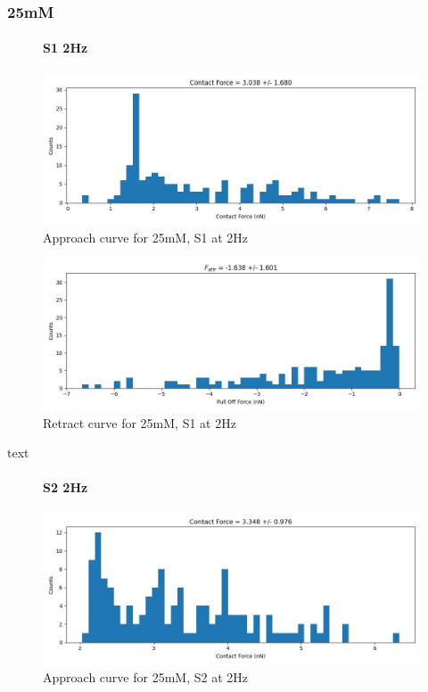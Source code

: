 \subsubsection*{25mM}

\begin{figure}[h!]
\paragraph{S1 2Hz}
\centering
\includegraphics[width=\textwidth]{chapter7/Tip speed/25mM/S1 2Hz/approach_f_c_hist.jpg}
\caption{Approach curve for 25mM, S1 at 2Hz}
\end{figure}

\begin{figure}[h!]
\centering
\includegraphics[width=\textwidth]{chapter7/Tip speed/25mM/S1 2Hz/retract_f_a_hist.jpg}
\caption{Retract curve for 25mM, S1 at 2Hz}
\end{figure}
text
\newpage


\begin{figure}[h!]
\paragraph{S2 2Hz}
\centering
\includegraphics[width=\textwidth]{chapter7/Tip speed/25mM/S2 2Hz/approach_f_c_hist.jpg}
\caption{Approach curve for 25mM, S2 at 2Hz}
\end{figure}

